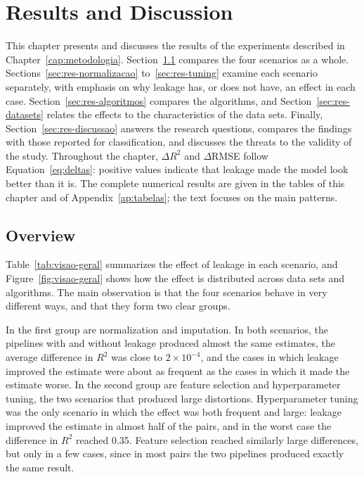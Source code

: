 \chapter{Results and Discussion}
\label{cap:resultados}

This chapter presents and discusses the results of the experiments described in
Chapter~\ref{cap:metodologia}. Section~\ref{sec:res-visao} compares the four
scenarios as a whole. Sections~\ref{sec:res-normalizacao}
to~\ref{sec:res-tuning} examine each scenario separately, with emphasis on why
leakage has, or does not have, an effect in each case.
Section~\ref{sec:res-algoritmos} compares the algorithms, and
Section~\ref{sec:res-datasets} relates the effects to the characteristics of the
data sets. Finally, Section~\ref{sec:res-discussao} answers the research
questions, compares the findings with those reported for classification, and
discusses the threats to the validity of the study. Throughout the chapter,
$\Delta R^2$ and $\Delta$RMSE follow Equation~\ref{eq:deltas}: positive values
indicate that leakage made the model look better than it is. The complete
numerical results are given in the tables of this chapter and of
Appendix~\ref{ap:tabelas}; the text focuses on the main patterns.

\section{Overview}
\label{sec:res-visao}

Table~\ref{tab:visao-geral} summarizes the effect of leakage in each scenario,
and Figure~\ref{fig:visao-geral} shows how the effect is distributed across data
sets and algorithms. The main observation is that the four scenarios behave in
very different ways, and that they form two clear groups.

In the first group are normalization and imputation. In both scenarios, the
pipelines with and without leakage produced almost the same estimates, the
average difference in $R^2$ was close to $2\times10^{-4}$, and the cases in which
leakage improved the estimate were about as frequent as the cases in which it
made the estimate worse. In the second group are feature selection and
hyperparameter tuning, the two scenarios that produced large distortions.
Hyperparameter tuning was the only scenario in which the effect was both frequent
and large: leakage improved the estimate in almost half of the pairs, and in the
worst case the difference in $R^2$ reached 0.35. Feature selection reached
similarly large differences, but only in a few cases, since in most pairs the
two pipelines produced exactly the same result.

